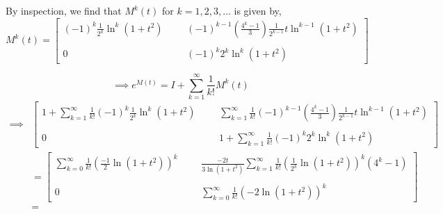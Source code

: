 By inspection, we find that \( M^{k} (t) \) for \( k = 1, 2, 3, \ldots \) is given by,
\begin{equation*}
    M^{k} (t)
    =
    \begin{bmatrix}
        \displaystyle
        {(-1)}^{k} \frac{1}{2^k} \ln^{k}(1+t^2)
        & & &
        \displaystyle
        {(-1)}^{k-1} \left( \frac{4^k-1}{3} \right) \frac{1}{2^{k-1}} t \ln^{k-1}(1+t^2)
        \\ \\
        0
        & & &
        \displaystyle
        {(-1)}^{k} 2^{k} \ln^{k}(1+t^2)
    \end{bmatrix}
\end{equation*}

\begin{equation*}
    \implies
    e^{M(t)}
      =
    I + \sum_{k=1}^{\infty} \frac{1}{k!} M^{k} (t)
\end{equation*}
\begin{align*}
    \implies
    &
    \begin{bmatrix}
        \displaystyle
        1 + \sum_{k=1}^{\infty} \frac{1}{k!} {(-1)}^{k} \frac{1}{2^k} \ln^{k}(1+t^2)
        & & &
        \displaystyle
        \sum_{k=1}^{\infty} \frac{1}{k!} {(-1)}^{k-1} \left( \frac{4^k-1}{3} \right) \frac{1}{2^{k-1}} t \ln^{k-1}(1+t^2)
        \\ \\
        0
        & & &
        \displaystyle
        1 + \sum_{k=1}^{\infty} \frac{1}{k!} {(-1)}^{k} 2^{k} \ln^{k}(1+t^2)
    \end{bmatrix}
    \\ & =
    \begin{bmatrix}
        \displaystyle
        \sum_{k=0}^{\infty} \frac{1}{k!} {\left( \frac{-1}{2} \ln(1+t^2) \right)}^{k}
        & & &
        \displaystyle
        \frac{-2t}{3\ln(1+t^2)} \sum_{k=1}^{\infty} \frac{1}{k!} {\left( \frac{1}{2^{k}} \ln(1+t^2) \right)}^{k} (4^k - 1)
        \\ \\
        0
        & & &
        \displaystyle
        \sum_{k=0}^{\infty} \frac{1}{k!} {(-2 \ln(1+t^2))}^{k}
    \end{bmatrix}
    \\ & =
\end{align*}
